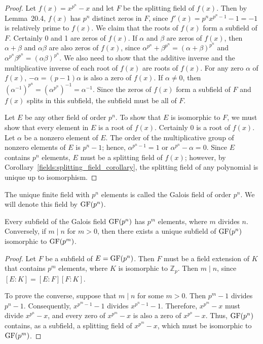 
\begin{proof}
Let $f(x) = x^{p^n} - x$ and let $F$ be the splitting field of $f(x)$.  Then by Lemma~20.4, $f(x)$ has $p^n$ distinct zeros in $F$, since $f'(x) = p^n x^{p^n - 1} - 1 = -1$ is relatively prime to $f(x)$.  We claim that the roots of $f(x)$ form a subfield of $F$.  Certainly 0 and 1 are zeros of $f(x)$.  If $\alpha$ and $\beta$ are zeros of $f(x)$, then $\alpha + \beta$ and $\alpha \beta$ are also zeros of $f(x)$, since $\alpha^{p^n} + \beta^{p^n} =  (\alpha + \beta)^{p^n}$ and $\alpha^{p^n} \beta^{p^n} = (\alpha \beta)^{p^n}$. We also need to show that the additive inverse and the multiplicative inverse of each root of $f(x)$ are roots of $f(x)$.  For any zero $\alpha$ of $f(x)$, $-\alpha = (p - 1)\alpha$ is also a zero of $f(x)$. If $\alpha \neq 0$, then $(\alpha^{-1})^{p^n} = (\alpha^{p^n})^{-1} = \alpha^{-1}$. Since the zeros of $f(x)$ form a subfield of $F$ and $f(x)$ splits in this subfield, the subfield must be all of $F$. 

Let $E$ be any other field of order $p^n$.  To show that $E$ is isomorphic to $F$, we must show that every element in $E$ is a root of $f(x)$.  Certainly 0 is a root of $f(x)$.  Let $\alpha$ be a nonzero element of $E$.  The order of the multiplicative group of nonzero elements of $E$ is $p^n-1$; hence, $\alpha^{p^n-1} =1$ or $\alpha^{p^n} -\alpha = 0$.  Since $E$ contains $p^n$ elements, $E$ must be a splitting field of $f(x)$; however, by Corollary~\ref{fields:splitting_field_corollary}, the splitting field of any polynomial is unique up to isomorphism. 
\end{proof}
 
\medskip

The unique finite field with $p^n$ elements is called the {\bfi Galois field\/} of order $p^n$. We will denote this field by ${\rm GF}(p^n)$\label{galoisfield}. 

\begin{theorem}
Every subfield of the Galois field ${\rm GF}(p^n)$ has $p^m$ elements, where $m$ divides $n$.  Conversely, if $m \mid n$ for $m > 0$, then  there exists a unique subfield of ${\rm GF}(p^n)$ isomorphic to  ${\rm GF}(p^m)$.
\end{theorem}

\begin{proof}
Let $F$ be a subfield of $E = {\rm GF}(p^n)$.  Then $F$ must be a field extension of $K$ that contains  $p^m$ elements, where $K$ is isomorphic to ${\mathbb Z}_p$.   Then $m \mid n$, since $[E:K] = [E:F][F:K]$.

To prove the converse, suppose that $m \mid n$ for some $m > 0$.  Then $p^m -1$ divides $p^n -1$. Consequently, $x^{p^m -1} - 1$ divides $x^{p^n -1} -1$. Therefore, $x^{p^m} - x$ must divide $x^{p^n} - x$, and every zero of $x^{p^m} - x$ is also a zero of $x^{p^n} - x$. Thus, ${\rm GF}(p^n)$ contains, as a subfield, a splitting field of $x^{p^m} - x$, which must be isomorphic to ${\rm GF}(p^m)$.
\end{proof}
     

